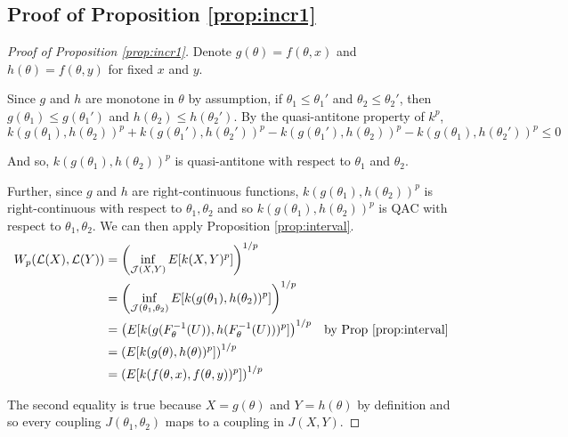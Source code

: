 \documentclass[12pt]{article}
\theoremstyle{plain}%
\theoremstyle{definition}
\begin{document}
	\subsection{Proof of Proposition \ref{prop:incr1}} \label{pf:incr1}
	\begin{proof}[Proof of Proposition \ref{prop:incr1}]
	Denote $g(\theta)=f(\theta,x)$ and $h(\theta)=f(\theta,y)$ for fixed $x$ and $y$.

	Since $g$ and $h$ are monotone in $\theta$ by assumption, if $\theta_1\leq \theta_1'$ and $\theta_2\leq \theta_2'$, then $g(\theta_1)\leq g(\theta_1')$ and $h(\theta_2)\leq h(\theta_2')$. By the quasi-antitone property of $k^p$,
	$$k\left(g(\theta_1),h(\theta_2)\right)^p+k\left(g(\theta_1'),h(\theta_2')\right)^p-k\left(g(\theta_1'),h(\theta_2)\right)^p-k\left(g(\theta_1),h(\theta_2')\right)^p\leq 0$$
	
	And so, $k(g(\theta_1),h(\theta_2))^p$ is quasi-antitone with respect to $\theta_1$ and $\theta_2$.
	
	Further, since $g$ and $h$ are right-continuous functions, $k(g(\theta_1),h(\theta_2))^p$ is right-continuous with respect to $\theta_1,\theta_2$ and so $k(g(\theta_1),h(\theta_2))^p$ is QAC with respect to $\theta_1,\theta_2$. We can then apply Proposition \ref{prop:interval}. 
	\begin{align*}
		W_p(\mathcal{L}(X), \mathcal{L}(Y)) &=\left(\inf_{\mathcal{J}(X,Y)}E[k(X,Y)^p]\right)^{1/p}\\
		&=\left(\inf_{\mathcal{J}(\theta_1,\theta_2)}E[k(g(\theta_1),h(\theta_2))^p] \right)^{1/p}\\
		&=\left(E[k(g(F^{-1}_{\theta}(U)),h(F^{-1}_{\theta}(U)))^p]\right)^{1/p} &\text{by Prop \ref{prop:interval}}\\
		&=\left(E[k(g(\theta),h(\theta))^p]\right)^{1/p}\\
		&=\left(E[k(f(\theta,x),f(\theta,y))^p]\right)^{1/p}
	\end{align*}
	
	The second equality is true because $X=g(\theta)$ and $Y=h(\theta)$ by definition and so every coupling $J(\theta_1,\theta_2)$ maps to a coupling in $J(X,Y)$. 
\end{proof}
\end{document}
